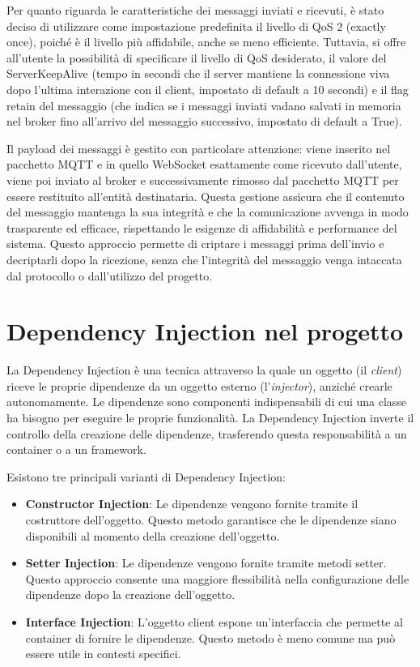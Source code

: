 \documentclass[12pt,a4paper,openright,twoside]{book}
\begin{document}
Per quanto riguarda le caratteristiche dei messaggi inviati e ricevuti, è stato deciso di utilizzare come impostazione predefinita il livello di \ac{QoS} 2 (exactly once), poiché è il livello più affidabile, 
anche se meno efficiente. Tuttavia, si offre all'utente la possibilità di specificare il livello di \ac{QoS} desiderato, 
il valore del ServerKeepAlive (tempo in secondi che il server mantiene la connessione viva dopo l'ultima interazione con il client, impostato di default a 10 secondi) 
e il flag retain del messaggio (che indica se i messaggi inviati vadano salvati in memoria nel broker fino all'arrivo del messaggio successivo, impostato di default a True). 

Il payload dei messaggi è gestito con particolare attenzione: viene inserito nel pacchetto \ac{MQTT} e in quello WebSocket esattamente come ricevuto dall'utente, viene poi inviato al broker e successivamente 
rimosso dal pacchetto \ac{MQTT} per essere restituito all'entità destinataria. Questa gestione assicura che il contenuto del messaggio mantenga la sua integrità e che la comunicazione avvenga in modo trasparente ed efficace, 
rispettando le esigenze di affidabilità e performance del sistema. Questo approccio permette di criptare i messaggi prima dell'invio e decriptarli dopo la ricezione, senza che l'integrità del messaggio venga intaccata dal 
protocollo o dall'utilizzo del progetto.

\section{Dependency Injection nel progetto}

La Dependency Injection è una tecnica attraverso la quale un oggetto (il \textit{client}) riceve le proprie dipendenze da un oggetto esterno 
(l'\textit{injector}), anziché crearle autonomamente. Le dipendenze sono componenti indispensabili di cui una classe ha bisogno per eseguire le proprie funzionalità.
La Dependency Injection inverte il controllo della creazione delle dipendenze, trasferendo questa responsabilità a un container o a un framework.

Esistono tre principali varianti di Dependency Injection:
\begin{itemize}
\item \textbf{Constructor Injection}: Le dipendenze vengono fornite tramite il costruttore dell'oggetto. 
    Questo metodo garantisce che le dipendenze siano disponibili al momento della creazione dell'oggetto.
\item \textbf{Setter Injection}: Le dipendenze vengono fornite tramite metodi setter. 
    Questo approccio consente una maggiore flessibilità nella configurazione delle dipendenze dopo la creazione dell'oggetto.
\item \textbf{Interface Injection}: L'oggetto client espone un'interfaccia che permette al container di fornire le dipendenze. 
    Questo metodo è meno comune ma può essere utile in contesti specifici.
\end{itemize}
\end{document}
